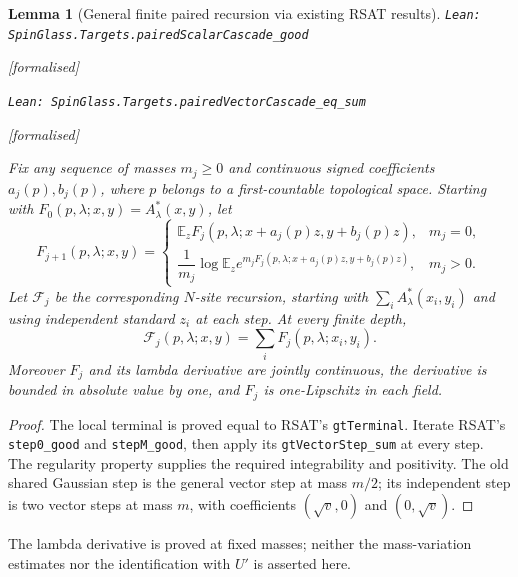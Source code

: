\documentclass[11pt]{article}
\providecommand{\lean}[1]{\leavevmode\par\nopagebreak
  {\noindent\normalfont\footnotesize\raggedright\texttt{Lean: #1}\par}\nopagebreak}
\providecommand{\leanok}{\par\nopagebreak
  {\noindent\normalfont\footnotesize\textcolor{green!50!black}{[formalised]}\par}\nopagebreak}
\newtheorem{lemma}[theorem]{Lemma}
\newcommand{\E}{\mathbb{E}}
\begin{document}
\begin{lemma}[General finite paired recursion via existing RSAT results]
\lean{SpinGlass.Targets.pairedScalarCascade\_good}\leanok
\lean{SpinGlass.Targets.pairedVectorCascade\_eq\_sum}\leanok
Fix any sequence of masses $m_j\ge0$ and continuous signed coefficients
$a_j(p),b_j(p)$, where $p$ belongs to a first-countable topological space.
Starting with $F_0(p,\lambda;x,y)=A^*_{\lambda}(x,y)$, let
\[
F_{j+1}(p,\lambda;x,y)
=\begin{cases}
\E_z F_j(p,\lambda;x+a_j(p)z,y+b_j(p)z),&m_j=0,\\
\dfrac1{m_j}\log\E_z e^{m_jF_j(p,\lambda;x+a_j(p)z,y+b_j(p)z)},&m_j>0.
\end{cases}
\]
Let $\mathcal F_j$ be the corresponding $N$-site recursion, starting with
$\sum_i A^*_{\lambda}(x_i,y_i)$ and using independent standard $z_i$ at each
step. At every finite depth,
\[
\mathcal F_j(p,\lambda;x,y)=\sum_i F_j(p,\lambda;x_i,y_i).
\]
Moreover $F_j$ and its lambda derivative are jointly continuous, the derivative
is bounded in absolute value by one, and $F_j$ is one-Lipschitz in each field.
\end{lemma}
\begin{proof}
The local terminal is proved equal to RSAT's \texttt{gtTerminal}. Iterate
RSAT's \texttt{step0\_good} and \texttt{stepM\_good}, then apply its
\texttt{gtVectorStep\_sum} at every step. The regularity property supplies
the required integrability and positivity. The old shared Gaussian step is
the general vector step at mass $m/2$; its independent step is two vector
steps at mass $m$, with coefficients $(\sqrt v,0)$ and $(0,\sqrt v)$.
\end{proof}
The lambda derivative is proved at fixed masses; neither the
mass-variation estimates nor the identification with $U'$ is asserted here.
\end{document}
